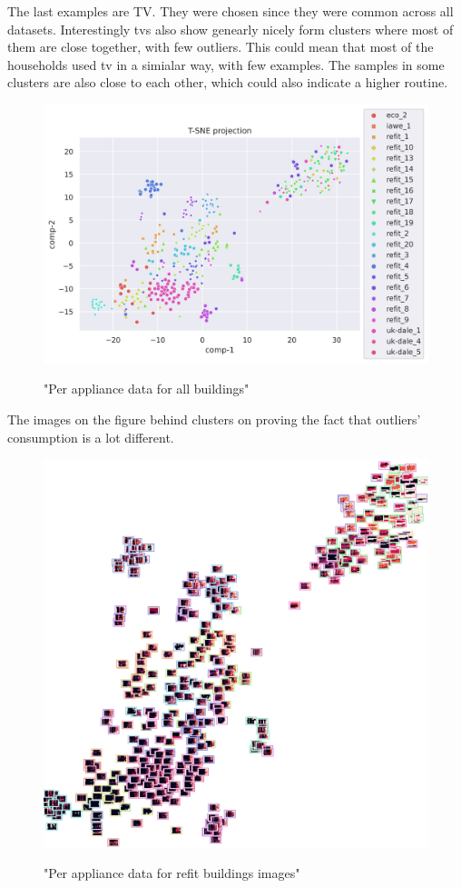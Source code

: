 The last examples are TV. They were chosen since they were common across all datasets.
Interestingly tvs also show genearly nicely form clusters where most of them are close 
together, with few outliers.
This could mean that most of the households used tv in a simialar way, with few examples.
The samples in some clusters are also close to each other, which could also indicate 
a higher routine.

\begin{figure}[H]
	\centering
	\caption{"Per appliance data for all buildings"}
	\includegraphics[width=1.2\textwidth]{Figures/TSNE/TSNE_per_appliance/all/scatter_all_television.png}
	\label{fig:tsne_pa_scatter_all_tv}
\end{figure}

The images on the figure behind clusters on proving the fact that outliers' consumption is a lot different.

\begin{figure}[H]
	\centering
	\caption{"Per appliance data for refit buildings images"}
	\includegraphics[width=.9\textwidth]{Figures/TSNE/TSNE_per_appliance/all/img_scatter_alltelevision.png}
	\label{fig:tsne_pa_img_scatter_all_tv}
\end{figure}

